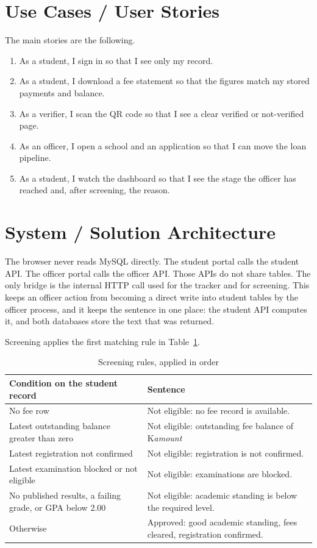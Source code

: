 \documentclass[12pt,a4paper]{report}
\begin{document}
\section{Use Cases / User Stories}
The main stories are the following.
\begin{enumerate}
    \item As a student, I sign in so that I see only my record.
    \item As a student, I download a fee statement so that the figures match my stored payments and balance.
    \item As a verifier, I scan the QR code so that I see a clear verified or not-verified page.
    \item As an officer, I open a school and an application so that I can move the loan pipeline.
    \item As a student, I watch the dashboard so that I see the stage the officer has reached and, after screening, the reason.
\end{enumerate}

\section{System / Solution Architecture}
The browser never reads MySQL directly. The student portal calls the student API. The officer portal calls the officer API. Those APIs do not share tables. The only bridge is the internal HTTP call used for the tracker and for screening. This keeps an officer action from becoming a direct write into student tables by the officer process, and it keeps the sentence in one place: the student API computes it, and both databases store the text that was returned.

Screening applies the first matching rule in Table~\ref{tab:rules}.

\begin{table}[H]
\centering
\caption{Screening rules, applied in order}
\label{tab:rules}
\begin{tabular}{p{}p{}}
\toprule
Condition on the student record & Sentence\\
\midrule
No fee row & Not eligible: no fee record is available.\\
Latest outstanding balance greater than zero & Not eligible: outstanding fee balance of K\textit{amount}\\
Latest registration not confirmed & Not eligible: registration is not confirmed.\\
Latest examination blocked or not eligible & Not eligible: examinations are blocked.\\
No published results, a failing grade, or GPA below 2.00 & Not eligible: academic standing is below the required level.\\
Otherwise & Approved: good academic standing, fees cleared, registration confirmed.\\
\bottomrule
\end{tabular}
\end{table}
\end{document}
